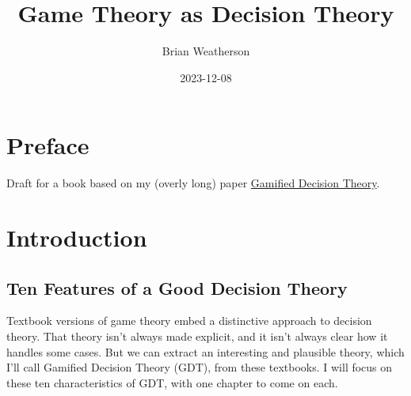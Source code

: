 \documentclass[
  12pt,
  letterpaper,
  DIV=11,
  numbers=noendperiod]{scrreprt}
\title{Game Theory as Decision Theory}
\author{Brian Weatherson}
\date{2023-12-08}
\renewcommand*\contentsname{Table of contents}
\newcommand\contentsname{Table of contents}
\begin{document}
\maketitle
\renewcommand*\contentsname{Table of contents}
{
\hypersetup{linkcolor=}
\setcounter{tocdepth}{2}
\tableofcontents
}

\chapter*{Preface}\label{preface}


Draft for a book based on my (overly long) paper
\href{https://brian.weatherson.org/gdt/gdt.html}{Gamified Decision
Theory}.


\chapter{Introduction}\label{sec-intro}

\section{Ten Features of a Good Decision Theory}\label{sec-ten-features}

Textbook versions of game theory embed a distinctive approach to
decision theory. That theory isn't always made explicit, and it isn't
always clear how it handles some cases. But we can extract an
interesting and plausible theory, which I'll call Gamified Decision
Theory (GDT), from these textbooks. I will focus on these ten
characteristics of GDT, with one chapter to come on each.
\end{document}
